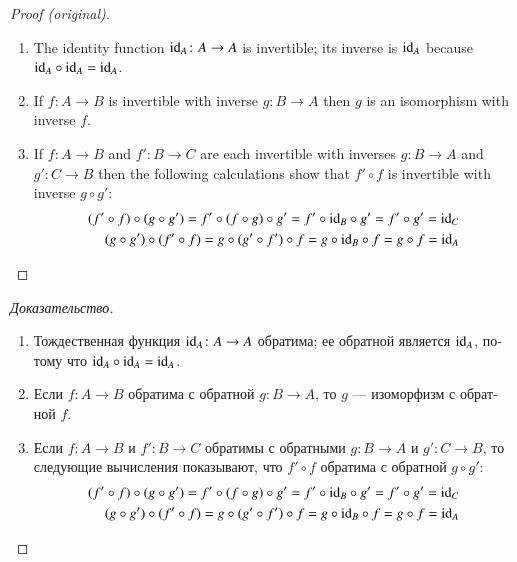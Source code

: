 \documentclass[a4paper]{book}
\def\tn{\textnormal}
\def\to{\rightarrow}
\def\taking{\colon}
\def\id{\tn{id}}
\theoremstyle{myth}
\newenvironment{proofENG}{\begin{proof}[Proof (original)]}{\end{proof}}
\newenvironment{proofRUS}{\begin{proof}[Доказательство]}{\end{proof}}
\begin{document}
\begin{russian}
\begin{proofENG}
\begin{enumerate}
\item The identity function $\id_A\taking A\to A$ is invertible; its inverse is $\id_A$ because $\id_A\circ\id_A=\id_A$.
\item If $f\taking A\to B$ is invertible with inverse $g\taking B\to A$ then $g$ is an isomorphism with inverse $f$.
\item If $f\taking A\to B$ and $f'\taking B\to C$ are each invertible with inverses $g\taking B\to A$ and $g'\taking C\to B$ then the following calculations show that $f'\circ f$ is invertible with inverse $g\circ g'$: 
\begin{align*}
(f'\circ f)\circ(g\circ g')=f'\circ(f\circ g)\circ g'=f'\circ\id_B\circ g'=f'\circ g'=\id_C\\
(g\circ g')\circ(f'\circ f)=g\circ(g'\circ f')\circ f=g\circ\id_B\circ f=g\circ f=\id_A
\end{align*}
\end{enumerate}
\end{proofENG}

\begin{proofRUS}
\begin{enumerate}
\item Тождественная функция $\id_A\taking A\to A$ обратима; ее обратной является $\id_A$, потому что $\id_A\circ\id_A=\id_A$.
\item Если $f\taking A\to B$ обратима с обратной $g\taking B\to A$, то $g$ — изоморфизм с обратной $f$.
\item Если $f\taking A\to B$ и $f'\taking B\to C$ обратимы с обратными $g\taking B\to A$ и $g'\taking C\to B$, то следующие вычисления показывают, что $f'\circ f$ обратима с обратной $g\circ g'$: 
\begin{align*}
(f'\circ f)\circ(g\circ g')=f'\circ(f\circ g)\circ g'=f'\circ\id_B\circ g'=f'\circ g'=\id_C\\
(g\circ g')\circ(f'\circ f)=g\circ(g'\circ f')\circ f=g\circ\id_B\circ f=g\circ f=\id_A
\end{align*}
\end{enumerate}
\end{proofRUS}


\end{russian}
\end{document}
